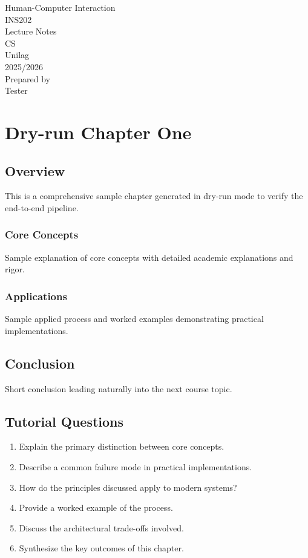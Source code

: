 \documentclass[12pt]{report}
\begin{document}
\begin{titlepage}
\thispagestyle{empty}
\centering
\vspace*{2cm}
{\LARGE Human-Computer Interaction}\\[1cm]
{\Large INS202}\\[1cm]
{\Large Lecture Notes}\\[1.5cm]
CS\\
Unilag\\
2025/2026\\[2cm]
Prepared by\\
Tester
\end{titlepage}

\tableofcontents
\newpage

\setcounter{chapter}{0}
\chapter{Dry-run Chapter One}

\section{Overview}
This is a comprehensive sample chapter generated in dry-run mode to verify the end-to-end pipeline.

\subsection{Core Concepts}
Sample explanation of core concepts with detailed academic explanations and rigor.

\subsection{Applications}
Sample applied process and worked examples demonstrating practical implementations.

\section{Conclusion}
Short conclusion leading naturally into the next course topic.

\section*{Tutorial Questions}
\begin{enumerate}
\item Explain the primary distinction between core concepts.
\item Describe a common failure mode in practical implementations.
\item How do the principles discussed apply to modern systems?
\item Provide a worked example of the process.
\item Discuss the architectural trade-offs involved.
\item Synthesize the key outcomes of this chapter.
\end{enumerate}
\end{document}
